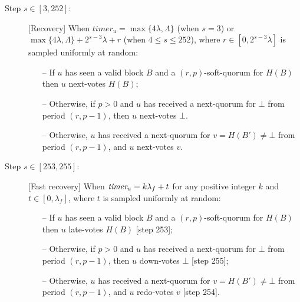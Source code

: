 \documentclass[../main.tex]{subfiles}
\begin{document}
\begin{description}
\item[{\sc Step $s \in [3,252]$:}] [Recovery]
When $timer_u = \max\{4\lambda,\Lambda\}$ (when $s=3$) or $\max\{4\lambda,\Lambda\} + 2^{s-3} \lambda + r$ (when $4 \leq s \leq 252$), where $r \in [0,2^{s-3}\lambda]$ is sampled uniformly at random:

\begin{itemize}

\item[--] If $u$ has seen a valid block $B$ and a $(r,p)$-soft-quorum for $H(B)$ then $u$ next-votes $H(B)$;

\item[--] Otherwise, if $p>0$ and $u$ has received a next-quorum for $\bot$ from period $(r,p-1)$, then $u$ next-votes $\bot$.

\item[--] Otherwise, $u$ has received a next-quorum for $v=H(B') \neq \bot$ from period $(r,p-1)$, and $u$ next-votes $v$.

\end{itemize}


\item[{\sc Step $s \in [253,255]$:}] [Fast recovery] When $\textit{timer}_u = k\lambda_f + t$ for any positive integer $k$ and $t \in [0,\lambda_f]$, where $t$ is sampled uniformly at random:

\begin{itemize}

\item[--] If $u$ has seen a valid block $B$ and a $(r,p)$-soft-quorum for $H(B)$ then $u$ late-votes $H(B)$ [step 253];

\item[--] Otherwise, if $p>0$ and $u$ has received a next-quorum for $\bot$ from period $(r,p-1)$, then $u$ down-votes $\bot$ [step 255];

\item[--] Otherwise, $u$ has received a next-quorum for $v=H(B') \neq \bot$ from period $(r,p-1)$, and $u$ redo-votes $v$ [step 254].

\end{itemize}
\end{description}
\end{document}
